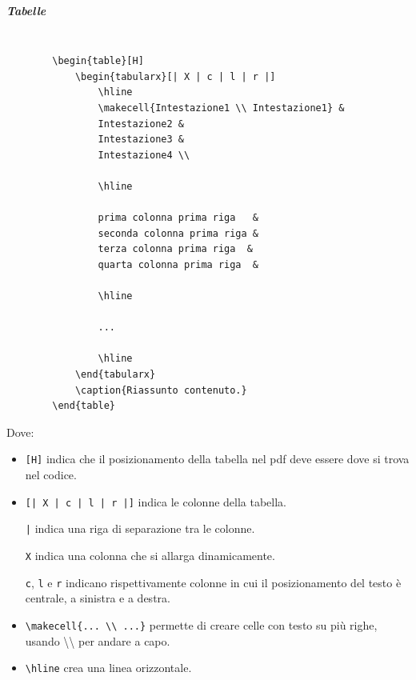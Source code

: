 \subparagraph{Tabelle}
\label{subpar:tabelle}
\begin{lstlisting}

        \begin{table}[H]
            \begin{tabularx}[| X | c | l | r |]
                \hline
                \makecell{Intestazione1 \\ Intestazione1} &
                Intestazione2 &
                Intestazione3 &
                Intestazione4 \\

                \hline

                prima colonna prima riga   &
                seconda colonna prima riga &
                terza colonna prima riga  &
                quarta colonna prima riga  &

                \hline

                ...

                \hline
            \end{tabularx}
            \caption{Riassunto contenuto.}
        \end{table}
\end{lstlisting}
Dove:
\begin{itemize}
    \item \lstinline+[H]+ indica che il posizionamento della tabella nel pdf deve essere dove si trova nel codice.
    
    \item \lstinline+[| X | c | l | r |]+ indica le colonne della tabella.

    \lstinline+|+ indica una riga di separazione tra le colonne.

    \lstinline+X+ indica una colonna che si allarga dinamicamente.

    \lstinline+c+, \lstinline+l+ e \lstinline+r+ indicano rispettivamente colonne in cui il posizionamento del testo è centrale, a sinistra e a destra.
    
    \item \lstinline+\makecell{... \\ ...}+ permette di creare celle con testo su più righe, usando \textbackslash\textbackslash{} per andare a capo. 

    \item \lstinline+\hline+ crea una linea orizzontale.
\end{itemize}

